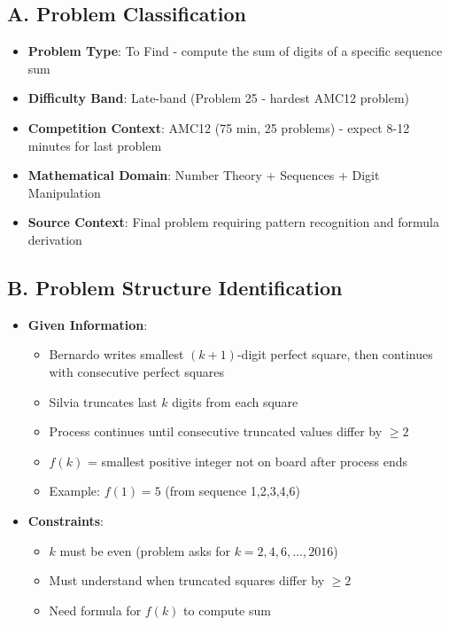 \documentclass[]{article}
\begin{document}
\begin{problemconfigbox}
\subsection*{A. Problem Classification}
\begin{itemize}[leftmargin=*]
    \item \textbf{Problem Type}: To Find - compute the sum of digits of a specific sequence sum
    \item \textbf{Difficulty Band}: Late-band (Problem 25 - hardest AMC12 problem)
    \item \textbf{Competition Context}: AMC12 (75 min, 25 problems) - expect 8-12 minutes for last problem
    \item \textbf{Mathematical Domain}: Number Theory + Sequences + Digit Manipulation
    \item \textbf{Source Context}: Final problem requiring pattern recognition and formula derivation
\end{itemize}

\subsection*{B. Problem Structure Identification}
\begin{itemize}[leftmargin=*]
    \item \textbf{Given Information}: 
    \begin{itemize}
        \item Bernardo writes smallest $(k+1)$-digit perfect square, then continues with consecutive perfect squares
        \item Silvia truncates last $k$ digits from each square
        \item Process continues until consecutive truncated values differ by $\geq 2$
        \item $f(k)$ = smallest positive integer not on board after process ends
        \item Example: $f(1) = 5$ (from sequence 1,2,3,4,6)
    \end{itemize}
    
    \item \textbf{Constraints}: 
    \begin{itemize}
        \item $k$ must be even (problem asks for $k = 2,4,6,\ldots,2016$)
        \item Must understand when truncated squares differ by $\geq 2$
        \item Need formula for $f(k)$ to compute sum
    \end{itemize}
    

\end{itemize}
\end{problemconfigbox}
\end{document}
